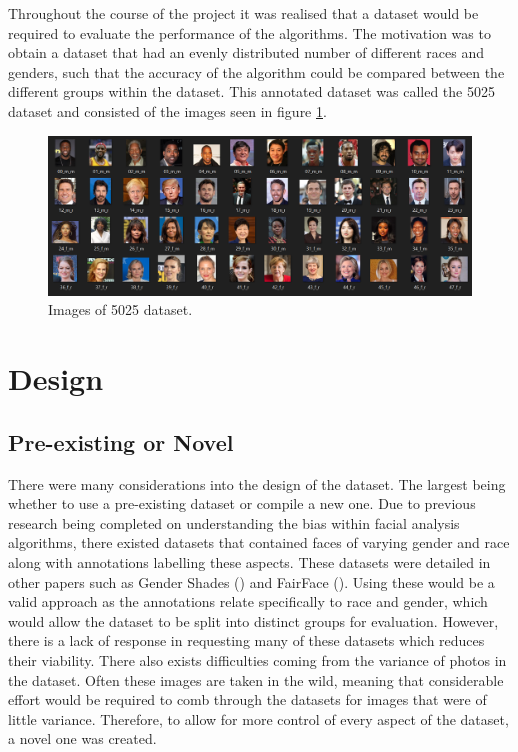 \documentclass{l4proj}
\begin{document}
Throughout the course of the project it was realised that a dataset would be required to evaluate the performance of the algorithms. The motivation was to obtain a dataset that had an evenly distributed number of different races and genders, such that the accuracy of the algorithm could be compared between the different groups within the dataset. This annotated dataset was called the 5025 dataset and consisted of the images seen in figure \ref{5025}.
\begin{figure}[h!]
  \centering
  \begin{minipage}{\textwidth}
    \includegraphics[width=\textwidth]{images/dataset.PNG}
    \caption{Images of 5025 dataset.}
    \label{5025}
  \end{minipage}
  \hfill
\end{figure}
\section{Design}
\label{datasetdesign}

\subsection{Pre-existing or Novel}
There were many considerations into the design of the dataset. The largest being whether to use a pre-existing dataset or compile a new one. Due to previous research being completed on understanding the bias within facial analysis algorithms, there existed datasets that contained faces of varying gender and race along with annotations labelling these aspects. These datasets were detailed in other papers such as Gender Shades (\cite{gendershades}) and FairFace (\cite{fairface}). Using these would be a valid approach as the annotations relate specifically to race and gender, which would allow the dataset to be split into distinct groups for evaluation. However, there is a lack of response in requesting many of these datasets which reduces their viability. There also exists difficulties coming from the variance of photos in the dataset. Often these images are taken in the wild, meaning that considerable effort would be required to comb through the datasets for images that were of little variance. Therefore, to allow for more control of every aspect of the dataset, a novel one was created.
\end{document}
